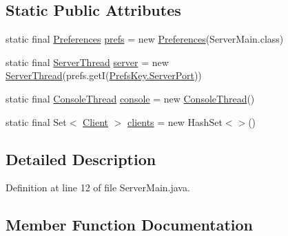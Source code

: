 \subsection*{Static Public Attributes}
\begin{DoxyCompactItemize}
\item 
static final \hyperlink{classpt_1_1up_1_1fe_1_1lpro1613_1_1sharedlib_1_1utils_1_1_preferences}{Preferences} \hyperlink{classpt_1_1up_1_1fe_1_1lpro1613_1_1server_1_1_server_main_af70c93d4f50a3f81c9edb159095f6b1c}{prefs} = new \hyperlink{classpt_1_1up_1_1fe_1_1lpro1613_1_1sharedlib_1_1utils_1_1_preferences}{Preferences}(Server\+Main.\+class)
\item 
static final \hyperlink{classpt_1_1up_1_1fe_1_1lpro1613_1_1server_1_1conn_1_1_server_thread}{Server\+Thread} \hyperlink{classpt_1_1up_1_1fe_1_1lpro1613_1_1server_1_1_server_main_a47b0d3f323dca42ff790cf040be6ce3a}{server} = new \hyperlink{classpt_1_1up_1_1fe_1_1lpro1613_1_1server_1_1conn_1_1_server_thread}{Server\+Thread}(prefs.\+getI(\hyperlink{enumpt_1_1up_1_1fe_1_1lpro1613_1_1server_1_1other_1_1_prefs_key_a92ee06ea77e828cd8272275f9309e142}{Prefs\+Key.\+Server\+Port}))
\item 
static final \hyperlink{classpt_1_1up_1_1fe_1_1lpro1613_1_1server_1_1other_1_1_console_thread}{Console\+Thread} \hyperlink{classpt_1_1up_1_1fe_1_1lpro1613_1_1server_1_1_server_main_af9f54f997c78d9974b788b66d05c4c2c}{console} = new \hyperlink{classpt_1_1up_1_1fe_1_1lpro1613_1_1server_1_1other_1_1_console_thread}{Console\+Thread}()
\item 
static final Set$<$ \hyperlink{classpt_1_1up_1_1fe_1_1lpro1613_1_1server_1_1conn_1_1_client}{Client} $>$ \hyperlink{classpt_1_1up_1_1fe_1_1lpro1613_1_1server_1_1_server_main_ad123167652dd573c163e4951b9eeada9}{clients} = new Hash\+Set$<$$>$()
\end{DoxyCompactItemize}


\subsection{Detailed Description}


Definition at line 12 of file Server\+Main.\+java.



\subsection{Member Function Documentation}
\hypertarget{classpt_1_1up_1_1fe_1_1lpro1613_1_1server_1_1_server_main_aa3501ccad0bb4a2f62168d8f84b12021}{}\label{classpt_1_1up_1_1fe_1_1lpro1613_1_1server_1_1_server_main_aa3501ccad0bb4a2f62168d8f84b12021} 
